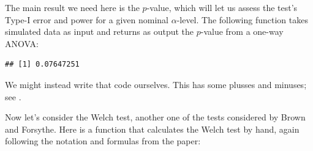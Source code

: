 \documentclass[
]{book}
\newenvironment{Shaded}{\begin{snugshade}}{\end{snugshade}}
\newcommand{\AttributeTok}[1]{\textcolor[rgb]{0.77,0.63,0.00}{#1}}
\newcommand{\ConstantTok}[1]{\textcolor[rgb]{0.00,0.00,0.00}{#1}}
\newcommand{\ControlFlowTok}[1]{\textcolor[rgb]{0.13,0.29,0.53}{\textbf{#1}}}
\newcommand{\FunctionTok}[1]{\textcolor[rgb]{0.00,0.00,0.00}{#1}}
\newcommand{\NormalTok}[1]{#1}
\newcommand{\OtherTok}[1]{\textcolor[rgb]{0.56,0.35,0.01}{#1}}
\newcommand{\SpecialCharTok}[1]{\textcolor[rgb]{0.00,0.00,0.00}{#1}}
\begin{document}
The main result we need here is the \(p\)-value, which will let us assess the test's Type-I error and power for a given nominal \(\alpha\)-level. The following function takes simulated data as input and returns as output the \(p\)-value from a one-way ANOVA:

\begin{Shaded}
\end{Shaded}

\begin{verbatim}
## [1] 0.07647251
\end{verbatim}

We might instead write that code ourselves.
This has some plusses and minuses; see \citet{optimize_code}.

Now let's consider the Welch test, another one of the tests considered by Brown and Forsythe.
Here is a function that calculates the Welch test by hand, again following the notation and formulas from the paper:
\end{document}
